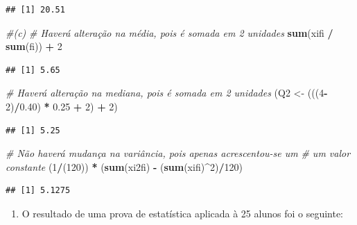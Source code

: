\documentclass[]{article}
\newenvironment{Shaded}{\begin{snugshade}}{\end{snugshade}}
\newcommand{\KeywordTok}[1]{\textcolor[rgb]{0.13,0.29,0.53}{\textbf{#1}}}
\newcommand{\DecValTok}[1]{\textcolor[rgb]{0.00,0.00,0.81}{#1}}
\newcommand{\FloatTok}[1]{\textcolor[rgb]{0.00,0.00,0.81}{#1}}
\newcommand{\StringTok}[1]{\textcolor[rgb]{0.31,0.60,0.02}{#1}}
\newcommand{\CommentTok}[1]{\textcolor[rgb]{0.56,0.35,0.01}{\textit{#1}}}
\newcommand{\OperatorTok}[1]{\textcolor[rgb]{0.81,0.36,0.00}{\textbf{#1}}}
\newcommand{\NormalTok}[1]{#1}
\providecommand{\tightlist}{%
  \setlength{\itemsep}{0pt}\setlength{\parskip}{0pt}}
\begin{document}
\begin{verbatim}
## [1] 20.51
\end{verbatim}

\begin{Shaded}
\begin{Highlighting}[]
\CommentTok{#(c)}
\CommentTok{# Haverá alteração na média, pois é somada em 2 unidades}
\KeywordTok{sum}\NormalTok{(xifi }\OperatorTok{/}\StringTok{ }\KeywordTok{sum}\NormalTok{(fi)) }\OperatorTok{+}\StringTok{ }\DecValTok{2}
\end{Highlighting}
\end{Shaded}

\begin{verbatim}
## [1] 5.65
\end{verbatim}

\begin{Shaded}
\begin{Highlighting}[]
\CommentTok{# Haverá alteração na mediana, pois é somada em 2 unidades}
\NormalTok{(Q2 <-}\StringTok{ }\NormalTok{(((}\DecValTok{4}\OperatorTok{-}\DecValTok{2}\NormalTok{)}\OperatorTok{/}\FloatTok{0.40}\NormalTok{) }\OperatorTok{*}\StringTok{ }\FloatTok{0.25} \OperatorTok{+}\StringTok{ }\DecValTok{2}\NormalTok{) }\OperatorTok{+}\StringTok{ }\DecValTok{2}\NormalTok{)}
\end{Highlighting}
\end{Shaded}

\begin{verbatim}
## [1] 5.25
\end{verbatim}

\begin{Shaded}
\begin{Highlighting}[]
\CommentTok{# Não haverá mudança na variância, pois apenas acrescentou-se um}
\CommentTok{# um valor constante}
\NormalTok{(}\DecValTok{1}\OperatorTok{/}\NormalTok{(}\DecValTok{120}\NormalTok{)) }\OperatorTok{*}\StringTok{ }\NormalTok{(}\KeywordTok{sum}\NormalTok{(xi2fi) }\OperatorTok{-}\StringTok{ }\NormalTok{(}\KeywordTok{sum}\NormalTok{(xifi)}\OperatorTok{^}\DecValTok{2}\NormalTok{)}\OperatorTok{/}\DecValTok{120}\NormalTok{)}
\end{Highlighting}
\end{Shaded}

\begin{verbatim}
## [1] 5.1275
\end{verbatim}

\begin{enumerate}
\def\labelenumi{\arabic{enumi}.}
\setcounter{enumi}{6}
\tightlist
\item
  O resultado de uma prova de estatística aplicada à 25 alunos foi o
  seguinte:
\end{enumerate}
\end{document}

